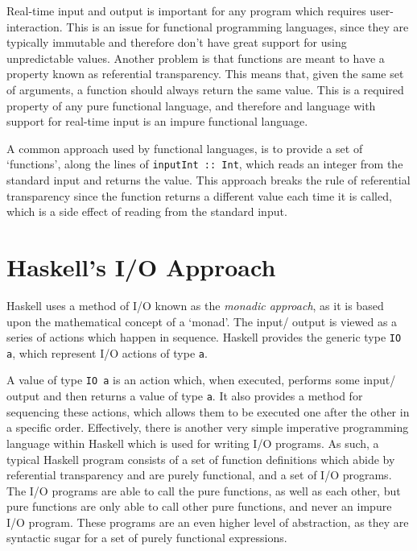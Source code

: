 
Real-time input and output is important for any program which requires user-interaction. This is an issue for functional
 programming languages, since they are typically immutable and therefore don't have great support for using unpredictable
 values. Another problem is that functions are meant to have a property known as referential transparency. This means
 that, given the same set of arguments, a function should always return the same value. This is a required property of
 any pure functional language, and therefore and language with support for real-time input is an impure functional
 language.

A common approach used by functional languages, is to provide a set of `functions', along the lines of \verb`inputInt :: Int`,
 which reads an integer from the standard input and returns the value. This approach breaks the rule of referential
 transparency since the function returns a different value each time it is called, which is a side effect of reading
 from the standard input.

\section*{Haskell's I/O Approach}

Haskell uses a method of I/O known as the \textit{monadic approach}, as it is based upon the mathematical concept of a
 `monad'. The input/ output is viewed as a series of actions which happen in sequence. Haskell provides the generic type
 \verb`IO a`, which represent I/O actions of type \verb`a`.

A value of type \verb`IO a` is an action which, when executed, performs some input/ output and then returns a value of
 type \verb`a`. It also provides a method for sequencing these actions, which allows them to be executed one after the
 other in a specific order. Effectively, there is another very simple imperative programming language within Haskell
 which is used for writing I/O programs. As such, a typical Haskell program consists of a set of function definitions
 which abide by referential transparency and are purely functional, and a set of I/O programs. The I/O programs are able
 to call the pure functions, as well as each other, but pure functions are only able to call other pure functions, and
 never an impure I/O program. These programs are an even higher level of abstraction, as they are syntactic sugar for a
 set of purely functional expressions.

